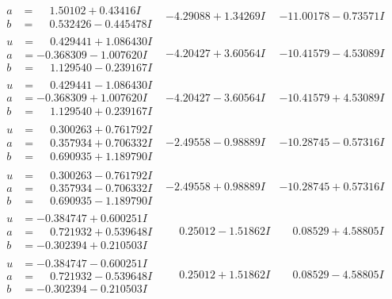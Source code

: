 \documentclass[1p]{elsarticle_modified}
\theoremstyle{definition}
\begin{document}
$$\begin{array}{c|c|c}
\begin{aligned}
a &= \phantom{-}1.50102 + 0.43416 I \\
b &= \phantom{-}0.532426 - 0.445478 I\end{aligned}
 & -4.29088 + 1.34269 I & -11.00178 - 0.73571 I \\ \hline\begin{aligned}
u &= \phantom{-}0.429441 + 1.086430 I \\
a &= -0.368309 - 1.007620 I \\
b &= \phantom{-}1.129540 - 0.239167 I\end{aligned}
 & -4.20427 + 3.60564 I & -10.41579 - 4.53089 I \\ \hline\begin{aligned}
u &= \phantom{-}0.429441 - 1.086430 I \\
a &= -0.368309 + 1.007620 I \\
b &= \phantom{-}1.129540 + 0.239167 I\end{aligned}
 & -4.20427 - 3.60564 I & -10.41579 + 4.53089 I \\ \hline\begin{aligned}
u &= \phantom{-}0.300263 + 0.761792 I \\
a &= \phantom{-}0.357934 + 0.706332 I \\
b &= \phantom{-}0.690935 + 1.189790 I\end{aligned}
 & -2.49558 - 0.98889 I & -10.28745 - 0.57316 I \\ \hline\begin{aligned}
u &= \phantom{-}0.300263 - 0.761792 I \\
a &= \phantom{-}0.357934 - 0.706332 I \\
b &= \phantom{-}0.690935 - 1.189790 I\end{aligned}
 & -2.49558 + 0.98889 I & -10.28745 + 0.57316 I \\ \hline\begin{aligned}
u &= -0.384747 + 0.600251 I \\
a &= \phantom{-}0.721932 + 0.539648 I \\
b &= -0.302394 + 0.210503 I\end{aligned}
 & \phantom{-}0.25012 - 1.51862 I & \phantom{-}0.08529 + 4.58805 I \\ \hline\begin{aligned}
u &= -0.384747 - 0.600251 I \\
a &= \phantom{-}0.721932 - 0.539648 I \\
b &= -0.302394 - 0.210503 I\end{aligned}
 & \phantom{-}0.25012 + 1.51862 I & \phantom{-}0.08529 - 4.58805 I \\ \hline\begin{aligned}

\end{aligned}
\end{array}$$
\end{document}
